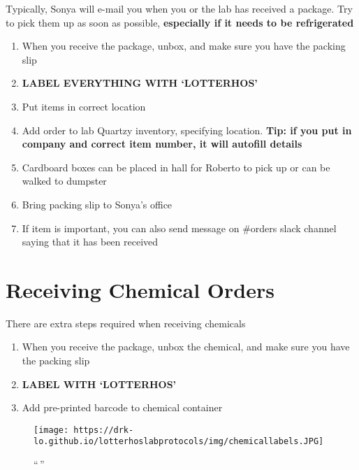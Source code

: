 \documentclass[
  letterpaper,
  DIV=11,
  numbers=noendperiod]{scrreprt}
\begin{document}
Typically, Sonya will e-mail you when you or the lab has received a
package. Try to pick them up as soon as possible, \textbf{especially if
it needs to be refrigerated}

\begin{enumerate}
\def\labelenumi{\arabic{enumi}.}
\item
  When you receive the package, unbox, and make sure you have the
  packing slip
\item
  \textbf{LABEL EVERYTHING WITH `LOTTERHOS'}
\item
  Put items in correct location
\item
  Add order to lab Quartzy inventory, specifying location. \textbf{Tip:
  if you put in company and correct item number, it will autofill
  details}
\item
  Cardboard boxes can be placed in hall for Roberto to pick up or can be
  walked to dumpster
\item
  Bring packing slip to Sonya's office
\item
  If item is important, you can also send message on \#orders slack
  channel saying that it has been received
\end{enumerate}

\hypertarget{receiving-chemical-orders}{%
\section*{\texorpdfstring{\textbf{Receiving Chemical
Orders}}{Receiving Chemical Orders}}\label{receiving-chemical-orders}}

There are extra steps required when receiving chemicals

\begin{enumerate}
\def\labelenumi{\arabic{enumi}.}
\item
  When you receive the package, unbox the chemical, and make sure you
  have the packing slip
\item
  \textbf{LABEL WITH `LOTTERHOS'}
\item
  Add pre-printed barcode to chemical container
\end{enumerate}

\begin{figure}

{\centering \texttt{[image: https://drk-lo.github.io/lotterhoslabprotocols/img/chemicallabels.JPG]}

}

\caption{``\,''}

\end{figure}
\end{document}
